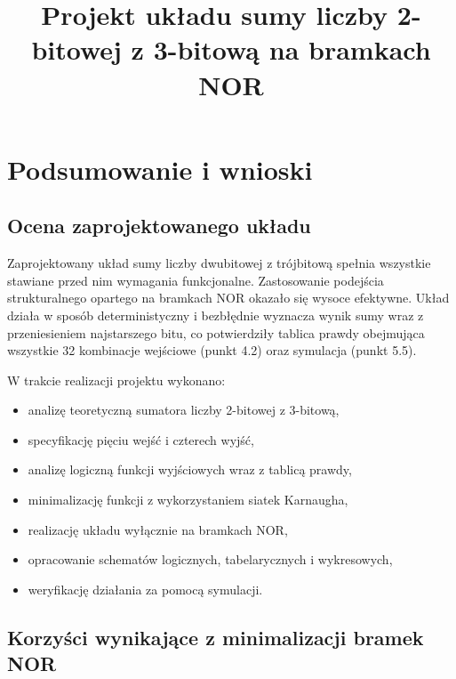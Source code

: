 \documentclass[11pt]{article}
\title{Projekt układu sumy liczby 2-bitowej z 3-bitową na bramkach NOR}
\author{}
\date{}
\begin{document}
\maketitle

\section{Podsumowanie i wnioski}

\subsection{Ocena zaprojektowanego układu}

Zaprojektowany układ sumy liczby dwubitowej z trójbitową spełnia wszystkie stawiane przed nim wymagania funkcjonalne. Zastosowanie podejścia strukturalnego opartego na bramkach NOR okazało się wysoce efektywne. Układ działa w sposób deterministyczny i bezbłędnie wyznacza wynik sumy wraz z przeniesieniem najstarszego bitu, co potwierdziły tablica prawdy obejmująca wszystkie 32 kombinacje wejściowe (punkt 4.2) oraz symulacja (punkt 5.5).

W trakcie realizacji projektu wykonano:
\begin{itemize}
    \item analizę teoretyczną sumatora liczby 2-bitowej z 3-bitową,
    \item specyfikację pięciu wejść i czterech wyjść,
    \item analizę logiczną funkcji wyjściowych wraz z tablicą prawdy,
    \item minimalizację funkcji z wykorzystaniem siatek Karnaugha,
    \item realizację układu wyłącznie na bramkach NOR,
    \item opracowanie schematów logicznych, tabelarycznych i wykresowych,
    \item weryfikację działania za pomocą symulacji.
\end{itemize}

\subsection{Korzyści wynikające z minimalizacji bramek NOR}
\end{document}
